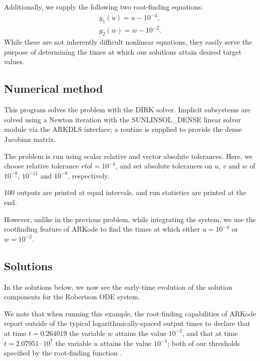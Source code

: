 \documentclass[letterpaper,10pt,english]{sphinxmanual}
\begin{document}
Additionally, we supply the following two root-finding equations:
\begin{equation*}
\begin{split}g_1(u) = u - 10^{-4}, \\
g_2(w) = w - 10^{-2}.\end{split}
\end{equation*}
While these are not inherently difficult nonlinear equations, they
easily serve the purpose of determining the times at which our
solutions attain desired target values.


\subsection{Numerical method}
\label{\detokenize{c_serial:id16}}
This program solves the problem with the DIRK solver.  Implicit
subsystems are solved using a Newton iteration with the
SUNLINSOL\_DENSE linear solver module via the ARKDLS interface; a
routine is supplied to provide the dense Jacobian matrix.

The problem is run using scalar relative and vector absolute
tolerances.  Here, we choose relative tolerance \(rtol=10^{-4}\),
and set absolute tolerances on \(u\), \(v\) and \(w\) of
\(10^{-8}\), \(10^{-11}\) and \(10^{-8}\), respectively.

100 outputs are printed at equal intervals, and run statistics are
printed at the end.

However, unlike in the previous problem, while integrating the system,
we use the rootfinding feature of ARKode to find the times at which
either \(u=10^{-4}\) or \(w=10^{-2}\).


\subsection{Solutions}
\label{\detokenize{c_serial:id17}}
In the solutions below, we now see the early-time evolution of the
solution components for the Robertson ODE system.

\begin{figure}[htbp]
\centering

\noindent{}
\end{figure}

We note that when running this example, the root-finding capabilities
of ARKode report outside of the typical logarithmically-spaced output
times to declare that at time \(t=0.264019\) the variable
\(w\) attains the value \(10^{-2}\), and that at time
\(t=2.07951\cdot10^{7}\) the variable \(u\) attains the value
\(10^{-4}\); both of our thresholds specified by the root-finding
function .
\end{document}
